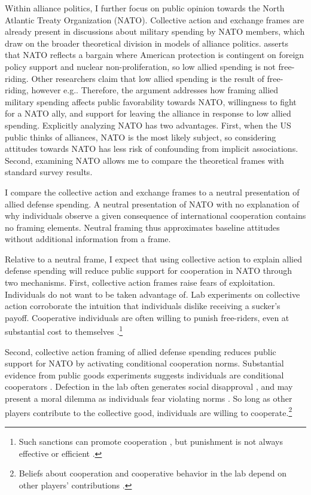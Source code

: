 \documentclass[12pt]{article}
\begin{document}
Within alliance politics, I further focus on public opinion towards the North Atlantic Treaty Organization (NATO). 
Collective action and exchange frames are already present in discussions about military spending by NATO members, which draw on the broader theoretical division in models of alliance politics.
\citet{Lanoszka2015} asserts that NATO reflects a bargain where American protection is contingent on foreign policy support and nuclear non-proliferation, so low allied spending is not free-riding. 
Other researchers claim that low allied spending is the result of free-riding, however e.g.\citep{OlsonZeckhauser1966, PluemperNeumayer2015, KimSandler2019}.
Therefore, the argument addresses how framing allied military spending affects public favorability towards NATO, willingness to fight for a NATO ally, and support for leaving the alliance in response to low allied spending. 
Explicitly analyzing NATO has two advantages.
First, when the US public thinks of alliances, NATO is the most likely subject, so considering attitudes towards NATO has less risk of confounding from implicit associations. 
Second, examining NATO allows me to compare the theoretical frames with standard survey results.


I compare the collective action and exchange frames to a neutral presentation of allied defense spending. 
A neutral presentation of NATO with no explanation of why individuals observe a given consequence of international cooperation contains no framing elements. 
Neutral framing thus approximates baseline attitudes without additional information from a frame. 


Relative to a neutral frame, I expect that using collective action to explain allied defense spending will reduce public support for cooperation in NATO through two mechanisms.
First, collective action frames raise fears of exploitation. 
Individuals do not want to be taken advantage of. 
Lab experiments on collective action corroborate the intuition that individuals dislike receiving a sucker's payoff. 
Cooperative individuals are often willing to punish free-riders, even at substantial cost to themselves \citep{FehrGatcher2000, Seftonetal2007}.\footnote{Such sanctions can promote cooperation \citep{Guererketal2006}, but punishment is not always effective \citep{Houseretal2008} or efficient \citep{Pageetal2005, Seftonetal2007, Randetal2009}.}


Second, collective action framing of allied defense spending reduces public support for NATO by activating conditional cooperation norms. 
Substantial evidence from public goods experiments suggests individuals are conditional cooperators \citep{Chaudhuri2011}.
Defection in the lab often generates social disapproval \citep{GachterFehr1999, Cubittetal2011a}, and may present a moral dilemma as individuals fear violating norms \citep{Nielsenetal2014}. 
So long as other players contribute to the collective good, individuals are willing to cooperate.\footnote{Beliefs about cooperation and cooperative behavior in the lab depend on other players' contributions \citep{FischbacherGachter2010}.}
\end{document}
